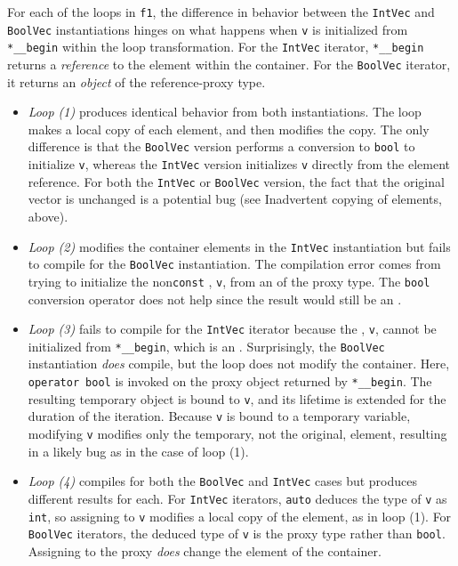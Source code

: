 {{{\noindent For each of the loops in \lstinline!f1!, the difference in behavior between
the \lstinline!IntVec! and \lstinline!BoolVec! instantiations hinges on what
happens when \lstinline!v! is initialized from \lstinline!*__begin! within
the loop transformation. For the \lstinline!IntVec! iterator,
\lstinline!*__begin! returns a \emph{reference} to the element within the
container. For the \lstinline!BoolVec! iterator, it returns an
\emph{object} of the reference-proxy type.
\begin{itemize}
\item{\emph{Loop (1)} produces identical behavior from both instantiations. The loop makes a local copy of each element, and then modifies the copy. The only difference is that the \lstinline!BoolVec! version performs a conversion to \lstinline!bool! to initialize \lstinline!v!, whereas the \lstinline!IntVec! version initializes \lstinline!v! directly from the element reference. For both the \lstinline!IntVec! or \lstinline!BoolVec! version, the fact that the original vector is unchanged is a potential bug (see Inadvertent copying of elements, above).}
\item{\emph{Loop (2)} modifies the container elements in the \lstinline!IntVec! instantiation but fails to compile for the \lstinline!BoolVec! instantiation. The compilation error comes from trying to initialize the non\lstinline!const! , \lstinline!v!, from an  of the proxy type. The \lstinline!bool! conversion operator does not help since the result would still be an .}
\item{\emph{Loop (3)} fails to compile for the \lstinline!IntVec! iterator because the , \lstinline!v!, cannot be initialized from \lstinline!*__begin!, which is an . Surprisingly, the \lstinline!BoolVec! instantiation \emph{does} compile, but the loop does not modify the container. Here, \lstinline!operator!~\lstinline!bool! is invoked on the proxy object returned by \lstinline!*__begin!. The resulting temporary object is bound to \lstinline!v!, and its lifetime is extended for the duration of the iteration. Because \lstinline!v! is bound to a temporary variable, modifying \lstinline!v! modifies only the temporary, not the original, element, resulting in a likely bug as in the case of loop (1).}
\item{\emph{Loop (4)} compiles for both the \lstinline!BoolVec! and \lstinline!IntVec! cases but produces different results for each. For \lstinline!IntVec! iterators, \lstinline!auto! deduces the type of \lstinline!v! as \lstinline!int!, so assigning to \lstinline!v! modifies a local copy of the element, as in loop (1). For \lstinline!BoolVec! iterators, the deduced type of \lstinline!v! is the proxy type rather than \lstinline!bool!. Assigning to the proxy \emph{does} change the element of the container.}

\end{itemize}}}}
